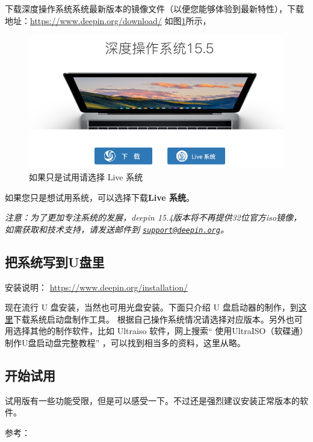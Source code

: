 \documentclass[doctor,openright,twoside]{sjtuthesis}
\theoremstyle{plain}
\theoremstyle{definition}
\theoremstyle{remark}
\theoremstyle{ocrenumbox}
\theoremstyle{plain}
\begin{document}
下载深度操作系统系统最新版本的镜像文件（以便您能够体验到最新特性），下载地址：\url{https://www.deepin.org/download/} 如图\ref{fig:livecd}所示，

\begin{figure}
\includegraphics{linux-desktop-live} \caption[如果只是试用请选择 Live 系统]{如果只是试用请选择 Live 系统}\label{fig:livecd}
\end{figure}

如果您只是想试用系统，可以选择下载\textbf{Live 系统}。

\emph{注意：为了更加专注系统的发展，deepin 15.4版本将不再提供32位官方iso镜像，如需获取和技术支持，请发送邮件到 \href{mailto:support@deepin.org}{\nolinkurl{support@deepin.org}}。}

\hypertarget{u}{%
\subsection{把系统写到U盘里}\label{u}}

安装说明： \url{https://www.deepin.org/installation/}

现在流行 U 盘安装，当然也可用光盘安装。下面只介绍 U 盘启动器的制作，到\href{https://www.deepin.org/original/deepin-boot-maker/}{这里}下载系统启动盘制作工具。
根据自己操作系统情况请选择对应版本。另外也可用选择其他的制作软件，比如 Ultraiso 软件，网上搜索`` 使用UltraISO（软碟通）制作U盘启动盘完整教程'' ，可以找到相当多的资料，这里从略。

\hypertarget{section-7}{%
\subsection{开始试用}\label{section-7}}

试用版有一些功能受限，但是可以感受一下。不过还是强烈建议安装正常版本的软件。

参考：
\end{document}
